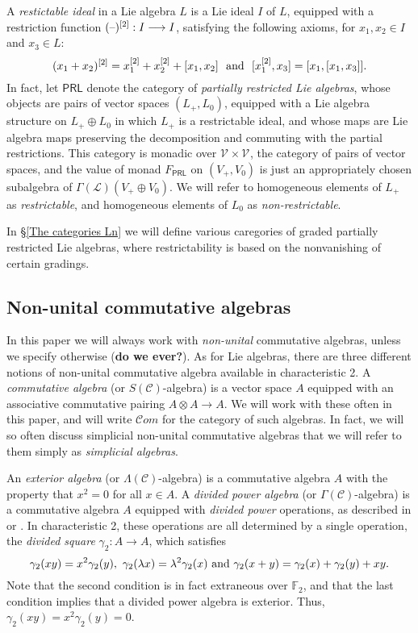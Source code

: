 \documentclass[11pt]{amsart}
\theoremstyle{plain}
\theoremstyle{definition}
\newcommand{\DASH}{\textup{--}}
\renewcommand{\to}{\longrightarrow}
\newcommand{\scrL}{\mathscr{L}}
\newcommand{\scrC}{\mathscr{C}}
\newcommand{\calV}{\mathcal{V}}
\theoremstyle{plain}
\newcommand{\LieOperad}{{\scrL}}
\newcommand{\CommOperad}{{\scrC}}
\newcommand{\restn}[1]{#1^{[2]}}
\newcommand{\vect}[2]{\calV^{#1}_{#2}}
\newcommand{\F}{\mathbb{F}}
\newcommand{\algs}{{\scrC\!\textit{om}}}
\begin{document}
\begin{Conventions and notation}
A \emph{restictable ideal} in a Lie algebra $L$ is a Lie ideal $I$ of $L$, equipped with a restriction function $\restn{(\DASH)}:I\to I$, satisfying the following axioms, for $x_1,x_2\in I$ and $x_3\in L$:
\[\restn{(x_1+x_2)}=\restn{x_1}+\restn{x_2}+[x_1,x_2]\textup{ \ and \ }[\restn{x_1},x_3]=[x_1,[x_1,x_3]].\]
In fact, let $\mathsf{PRL}$ denote the category of \emph{partially restricted Lie algebras}, whose objects are pairs of vector spaces $(L_+,L_0)$, equipped with a Lie algebra structure on $L_+\oplus L_0$ in which $L_+$ is a restrictable ideal, and whose maps are Lie algebra maps preserving the decomposition and commuting with the partial restrictions. This category is monadic over $\vect{}{}\times\vect{}{}$, the category of pairs of vector spaces, and the value of monad $F_{\mathsf{PRL}}$  on $(V_+,V_0)$ is just an appropriately chosen subalgebra of $\Gamma(\LieOperad)(V_+\oplus V_0)$. We will refer to homogeneous elements of $L_+$ as \emph{restrictable}, and homogeneous elements of $L_0$ as \emph{non-restrictable}.

In \S\ref{The categories Ln} we will define various caregories of graded partially restricted Lie algebras, where restrictability is based on the nonvanishing of certain gradings.


\subsection{Non-unital commutative algebras}
In this paper we will always work with \emph{non-unital} commutative algebras, unless we specify otherwise (\textbf{do we ever?}). As for Lie algebras, there are three different notions of non-unital commutative algebra available in characteristic 2. A \emph{commutative algebra} (or $S(\CommOperad)$-algebra) is a vector space $A$ equipped with an associative commutative pairing $A\otimes A\to A$.  We will work with these often in this paper, and will write $\algs$ for the category of such algebras. In fact, we will so often discuss simplicial non-unital commutative algebras that we will refer to them simply as \emph{simplicial algebras}.

An \emph{exterior algebra} (or $\Lambda(\CommOperad)$-algebra) is a commutative algebra $A$ with the property that $x^2=0$ for all $x\in A$. A \emph{divided power algebra} (or $\Gamma(\CommOperad)$-algebra) is a commutative algebra $A$ equipped with \emph{divided power} operations, as described in \cite[1.2.2]{FresseSimplicialAlgs.pdf} or \cite[\S2]{MR1089001}. In characteristic 2, these operations are all determined by a single operation, the \emph{divided square} $\gamma_2:A\to A$, which satisfies
\[\gamma_2(xy)=x^2\gamma_2(y),\ \gamma_2(\lambda x)=\lambda^2\gamma_2(x)\textup{ and }\gamma_2(x+y)=\gamma_2(x)+\gamma_2(y)+xy.\]
Note that the second condition is in fact extraneous over $\F_2$, and that the last condition implies that a divided power algebra is exterior. Thus, $\gamma_2(xy)=x^2\gamma_2(y)=0$.


\end{Conventions and notation}
\end{document}
